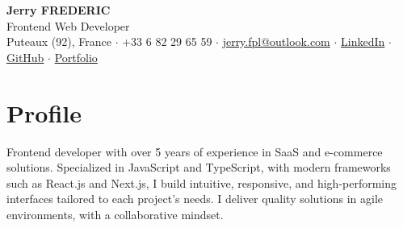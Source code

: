 \documentclass[9pt,a4paper]{extarticle}
\begin{document}
\begin{center}
  {\LARGE\bfseries Jerry FREDERIC}\\[0.15em]
  {\large\color{accent} Frontend Web Developer}\\[0.15em]
  {\footnotesize Puteaux (92), France \quad $\cdot$ \quad +33 6 82 29 65 59 \quad $\cdot$ \quad
  \href{mailto:jerry.fpl@outlook.com}{jerry.fpl@outlook.com} \quad $\cdot$ \quad
  \href{https://www.linkedin.com/in/jerry-frederic/}{LinkedIn} \quad $\cdot$ \quad
  \href{https://github.com/thateflondon}{GitHub} \quad $\cdot$ \quad
  \href{https://www.jfpl.fr/}{Portfolio}}
\end{center}

\vspace{0.3em}
\section{Profile}
Frontend developer with over 5 years of experience in SaaS and e-commerce solutions. Specialized in JavaScript and TypeScript, with modern frameworks such as React.js and Next.js, I build intuitive, responsive, and high-performing interfaces tailored to each project's needs. I deliver quality solutions in agile environments, with a collaborative mindset.

\vspace{0.5em}
\end{document}

